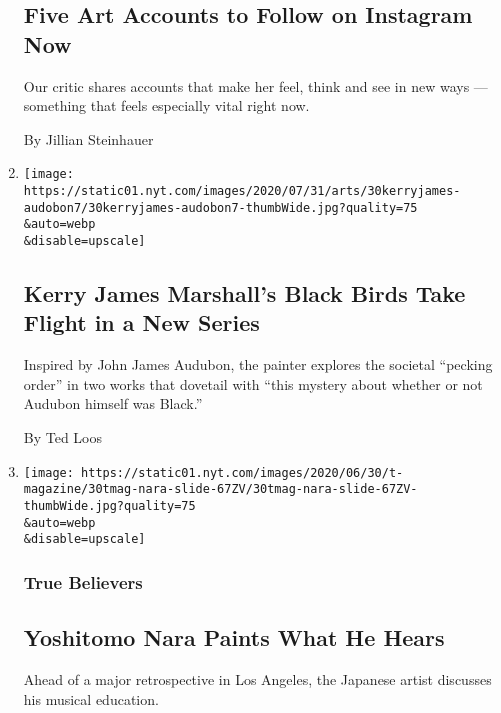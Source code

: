 \begin{enumerate}
{  \subsection{Five Art Accounts to Follow on Instagram
  Now}\label{five-art-accounts-to-follow-on-instagram-now}}

  Our critic shares accounts that make her feel, think and see in new
  ways --- something that feels especially vital right now.

  By Jillian Steinhauer
\item
  \href{/2020/07/29/arts/design/kerry-james-marshall-audubon.html}{}

  \texttt{[image: https://static01.nyt.com/images/2020/07/31/arts/30kerryjames-audobon7/30kerryjames-audobon7-thumbWide.jpg?quality=75\\\&auto=webp\\\&disable=upscale]}

  \hypertarget{kerry-james-marshalls-black-birds-take-flight-in-a-new-series}{%
  \subsection{Kerry James Marshall's Black Birds Take Flight in a New
  Series}\label{kerry-james-marshalls-black-birds-take-flight-in-a-new-series}}

  Inspired by John James Audubon, the painter explores the societal
  ``pecking order'' in two works that dovetail with ``this mystery about
  whether or not Audubon himself was Black.''

  By Ted Loos
\item
  \href{/2020/07/24/t-magazine/yoshitomo-nara.html}{}

  \texttt{[image: https://static01.nyt.com/images/2020/06/30/t-magazine/30tmag-nara-slide-67ZV/30tmag-nara-slide-67ZV-thumbWide.jpg?quality=75\\\&auto=webp\\\&disable=upscale]}

  \hypertarget{true-believers}{%
  \subsubsection{True Believers}\label{true-believers}}

  \hypertarget{yoshitomo-nara-paints-what-he-hears}{%
  \subsection{Yoshitomo Nara Paints What He
  Hears}\label{yoshitomo-nara-paints-what-he-hears}}

  Ahead of a major retrospective in Los Angeles, the Japanese artist
  discusses his musical education.


\end{enumerate}
